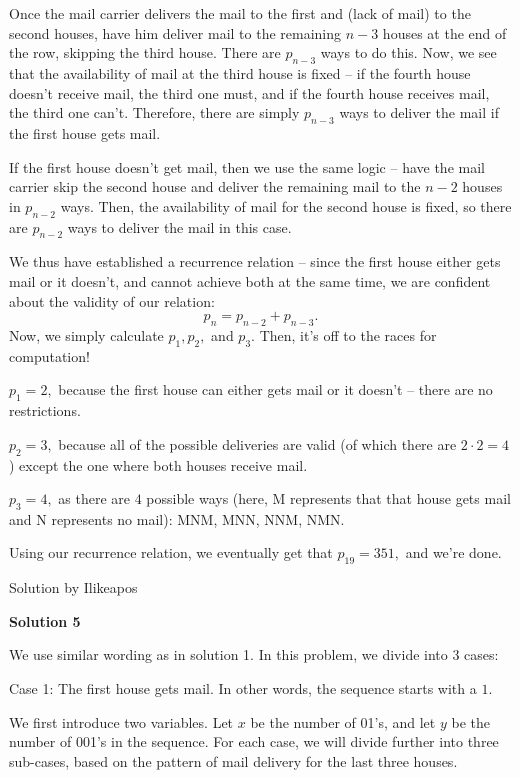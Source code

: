 \begin{enumerate}
 Once the mail carrier delivers the mail to the first and (lack of mail) to the second houses, have him deliver mail to the remaining $n - 3$ houses at the end of the row, skipping the third house. There are $p_{n - 3}$ ways to do this. Now, we see that the availability of mail at the third house is fixed -- if the fourth house doesn't receive mail, the third one must, and if the fourth house receives mail, the third one can't. Therefore, there are simply $p_{n-3}$ ways to deliver the mail if the first house gets mail.

 If the first house doesn't get mail, then we use the same logic -- have the mail carrier skip the second house and deliver the remaining mail to the $n - 2$ houses in $p_{n-2}$ ways. Then, the availability of mail for the second house is fixed, so there are $p_{n - 2}$ ways to deliver the mail in this case.

 We thus have established a recurrence relation -- since the first house either gets mail or it doesn't, and cannot achieve both at the same time, we are confident about the validity of our relation: 
 \[p_n = p_{n-2} + p_{n-3}.\]Now, we simply calculate $p_1, p_2,$ and $p_3.$ Then, it's off to the races for computation!

 $p_1 = 2,$ because the first house can either gets mail or it doesn't -- there are no restrictions.

 $p_2 = 3,$ because all of the possible deliveries are valid (of which there are $2 \cdot 2 = 4$) except the one where both houses receive mail.

 $p_3 = 4,$ as there are $4$ possible ways (here, M represents that that house gets mail and N represents no mail): MNM, MNN, NNM, NMN.

 Using our recurrence relation, we eventually get that $p_{19} = \boxed{351},$ and we're done. 

 Solution by Ilikeapos

 



\textbf{Solution 5}

We use similar wording as in solution 1. In this problem, we divide into 3 cases:

 Case 1: The first house gets mail. In other words, the sequence starts with a $1.$

 We first introduce two variables. Let $x$ be the number of 01's, and let $y$ be the number of 001's in the sequence. For each case, we will divide further into three sub-cases, based on the pattern of mail delivery for the last three houses.


\end{enumerate}
